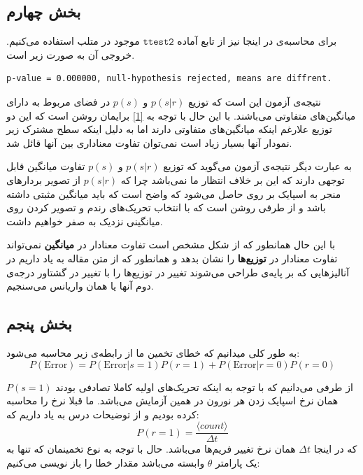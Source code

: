 \documentclass[12pt,onecolumn,a4paper,fleqn]{article}
\newcommand{\pf}[1]{$\mathtt{#1}$}
\begin{document}
\subsection{بخش چهارم}
برای محاسبه‌ی  در اینجا نیز از تابع آماده \pf{ttest2} موجود در متلب استفاده می‌کنیم. خروجی آن به صورت زیر است.

\begin{latin}
	\begin{lstlisting}[basicstyle=\small, frame = single]
p-value = 0.000000, null-hypothesis rejected, means are diffrent.
	\end{lstlisting}
\end{latin}
نتیجه‌ی آزمون  این است که توزیع‌ $p(s|r)$ و $p(s)$ در فضای مربوط به  دارای میانگین‌های متفاوتی می‌باشند. با این حال با توجه به \autoref{1} برایمان روشن است که این دو توزیع علارغم اینکه میانگین‌های متفاوتی دارند اما به دلیل اینکه‌ سطح مشترک زیر نمودار آنها بسیار زیاد است نمی‌توان تفاوت معناداری بین آنها قائل شد.

به عبارت دیگر نتیجه‌ی آزمون می‌گوید که توزیع‌ $p(s|r)$ و $p(s)$ تفاوت میانگین قابل توجهی دارند که این بر خلاف انتظار ما نمی‌باشد چرا که $p(s|r)$ از تصویر بردارهای منجر به اسپایک بر روی  حاصل می‌شود که واضح است که باید میانگین مثبتی داشته باشد و از طرفی روشن است که با انتخاب تحریک‌های رندم و تصویر کردن روی  میانگینی نزدیک به صفر خواهیم داشت.

با این حال همانطور که از شکل مشخص است تفاوت معنادار در \textbf{میانگین} نمی‌تواند تفاوت معنادار در \textbf{توزیع‌ها} را نشان بدهد و همانطور که از متن مقاله به یاد داریم در آنالیزهایی که بر پایه‌ی  طراحی می‌شوند تغییر در توزیع‌ها را با تغییر در گشتاور درجه‌ی دوم آنها یا همان واریانس می‌سنجیم.

\subsection{بخش پنجم}
به طور کلی میدانیم که خطای تخمین ما از رابطه‌ی زیر محاسبه می‌شود:
$$ P(\text{Error}) = P(\text{Error}|s=1)P(r=1) + P(\text{Error}|r=0)P(r=0) $$

از طرفی می‌دانیم که با توجه به اینکه تحریک‌های اولیه‌ کاملا تصادفی بودند  $P(s=1)$ همان نرخ اسپایک زدن هر نورون در همین آزمایش می‌باشد. ما قبلا نرخ  را محاسبه کرده بودیم و از توضیحات درس به یاد داریم که:
$$ P(r=1) = \dfrac{\langle count \rangle}{\Delta t} $$ 
که در اینجا $\Delta t$ همان نرخ تغییر فریم‌ها می‌باشد. حال با توجه به نوع تخمینمان که تنها به یک پارامتر $\theta$ وابسته می‌باشد مقدار خطا را باز نویسی می‌کنیم:
\end{document}

